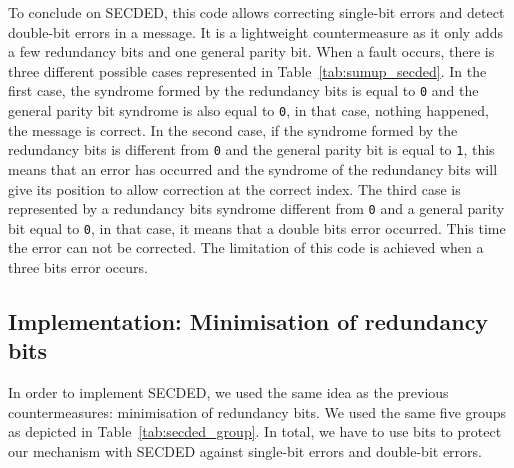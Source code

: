 To conclude on SECDED, this code allows correcting single-bit errors and detect double-bit errors in a message. It is a lightweight countermeasure as it only adds a few redundancy bits and one general parity bit. When a fault occurs, there is three different possible cases represented in Table~\ref{tab:sumup_secded}. In the first case, the syndrome formed by the redundancy bits is equal to \texttt{0} and the general parity bit syndrome is also equal to \texttt{0}, in that case, nothing happened, the message is correct.
In the second case, if the syndrome formed by the redundancy bits is different from \texttt{0} and the general parity bit is equal to \texttt{1}, this means that an error has occurred and the syndrome of the redundancy bits will give its position to allow correction at the correct index.
The third case is represented by a redundancy bits syndrome different from \texttt{0} and a general parity bit equal to \texttt{0}, in that case, it means that a double bits error occurred. This time the error can not be corrected. The limitation of this code is achieved when a three bits error occurs.

\subsection{Implementation: Minimisation of redundancy bits}

In order to implement SECDED, we used the same idea as the previous countermeasures: minimisation of redundancy bits. We used the same five groups as depicted in Table~\ref{tab:secded_group}. In total, we have to use  bits to protect our mechanism with SECDED against single-bit errors and double-bit errors.

